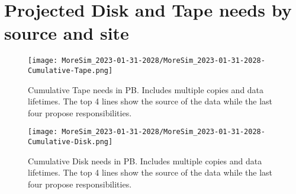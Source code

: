 \section{Projected Disk and Tape needs by source and site}
\begin{figure}[h]
\centering\texttt{[image: MoreSim\_2023-01-31-2028/MoreSim\_2023-01-31-2028-Cumulative-Tape.png]}
\caption{Cumulative Tape needs in PB. Includes multiple copies and data lifetimes. The top 4 lines show the source of the data while the last four propose responsibilities.}
\label{fig:Cumulative-Tape}
\end{figure}
\begin{figure}[h]
\centering\texttt{[image: MoreSim\_2023-01-31-2028/MoreSim\_2023-01-31-2028-Cumulative-Disk.png]}
\caption{Cumulative Disk needs in PB. Includes multiple copies and data lifetimes. The top 4 lines show the source of the data while the last four propose responsibilities.}
\label{fig:Cumulative-Disk}
\end{figure}

